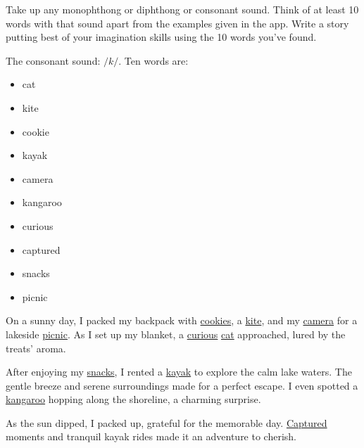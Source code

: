 	\begin{asign}[19/08/2023]
		Take up any monophthong or diphthong or consonant sound. Think of at least 10 words with that sound apart from the examples given in the app. Write a story putting best of your imagination skills using the 10 words you’ve found.
	\end{asign}
	The consonant sound: $/k/$. Ten words are:
	\begin{itemize}
		\item cat
		\item kite
		\item cookie
		\item kayak
		\item camera
		\item kangaroo
		\item curious
		\item captured
		\item snacks
		\item picnic
	\end{itemize}
	\begin{anse} 
		
		On a sunny day, I packed my backpack with \underline{cookies}, a \underline{kite}, and my \underline{camera} for a lakeside \underline{picnic}. As I set up my blanket, a \underline{curious} \underline{cat} approached, lured by the treats' aroma.
		
		After enjoying my \underline{snacks}, I rented a \underline{kayak} to explore the calm lake waters. The gentle breeze and serene surroundings made for a perfect escape. I even spotted a \underline{kangaroo} hopping along the shoreline, a charming surprise.
		
		As the sun dipped, I packed up, grateful for the memorable day. \underline{Captured} moments and tranquil kayak rides made it an adventure to cherish.
	\end{anse}
